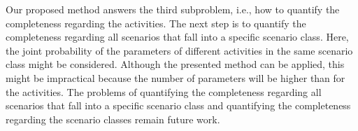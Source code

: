 Our proposed method answers the third subproblem, i.e., how to quantify the completeness regarding the activities. The next step is to quantify the completeness regarding all scenarios that fall into a specific scenario class. Here, the joint probability of the parameters of different activities in the same scenario class might be considered. Although the presented method can be applied, this might be impractical because the number of parameters will be higher than for the activities. The problems of quantifying the completeness regarding all scenarios that fall into a specific scenario class and quantifying the completeness regarding the scenario classes remain future work.
